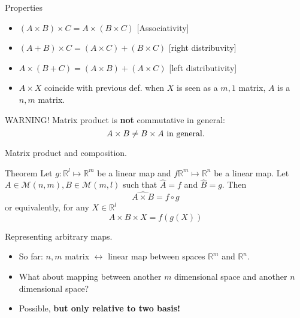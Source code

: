 \documentclass{beamer}
\begin{document}
\begin{frame}{Properties}
  \begin{itemize}
  \item $(A \times B) \times C = A \times (B \times C)$ [Associativity]
  \item $(A + B) \times C = (A \times C) + (B \times C)$ [right distribuvity]
  \item $A \times (B + C) = (A \times B) + (A \times C)$ [left distributivity]
  \item $A \times X$ coincide with previous def. when $X$ is seen as a $m, 1$ matrix, $A$ is a $n,m$ matrix.
  \end{itemize}

  \begin{alertblock}{WARNING!}
    Matrix product is {\bf not} commutative in general:
    \[ A \times B \neq B \times A \textnormal{ in general.}\] 
  \end{alertblock}
\end{frame}


\begin{frame}{Matrix product and composition.}
  \begin{block}{Theorem}
    Let $g: \mathbb{R}^l \mapsto \mathbb{R}^m$ be a linear map and $f \mathbb{R}^m \mapsto \mathbb{R}^n$ be a linear map. Let $A \in \mathcal{M}(n,m), B \in \mathcal{M}(m, l)$ such that $\hat A = f$ and $\hat B = g$. Then
    \[ \widehat{A \times B} = f \circ g \] or equivalently, for any $X \in \mathbb{R}^l$
    \[A \times B \times X = f(g(X))\]
  \end{block}
\end{frame}


\begin{frame}{Representing arbitrary maps.}
  \begin{itemize}
  \item So far: $n,m$ matrix $\leftrightarrow$ linear map between spaces $\mathbb{R}^m$ and $\mathbb{R}^n$.
  \item What about mapping between another $m$ dimensional space and another $n$ dimensional space?
  \item Possible, {\bf but only relative to two basis!}
  \end{itemize}
\end{frame}
\end{document}
